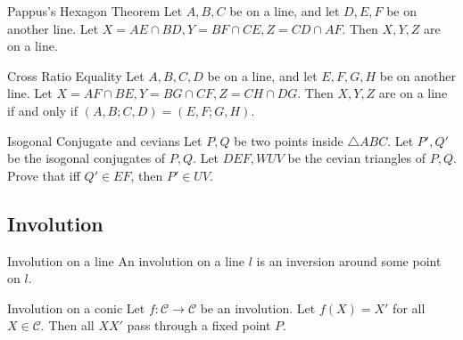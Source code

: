\vspace{-4em}
\begin{minipage}{.5\linewidth}
    \theo{}
    {Pappus's Hexagon Theorem}{
        Let $ A,B,C $ be on a line, and let $ D,E,F $ be on another line. Let
        $ X=AE\cap BD,Y=BF\cap CE,Z=CD\cap AF $. Then $ X,Y,Z $ are on a line.
    }


    \vspace{-2em}

    \theo{}
    {Cross Ratio Equality}{
        Let $ A,B,C,D $ be on a line, and let $ E,F,G,H $ be on another line.
        Let $X=AF\cap BE, Y=BG\cap CF, Z=CH\cap DG$. Then $ X,Y,Z $ are on a
        line if and only if $ (A,B;C,D) = (E,F;G,H) $.
    }	

    \vspace{2em}

    \prob{}
    {Isogonal Conjugate and cevians}{}{
        Let $P, Q$ be two points inside $\triangle ABC$. Let $P', Q'$ be the
        isogonal conjugates of $P, Q$. Let $DEF, WUV$ be the
        cevian triangles of $P, Q$. Prove that iff $Q'\in EF$, then $P'\in
        UV$.
    }
\end{minipage}\hfill%
\begin{minipage}{.47\linewidth}
    \vspace{5em}
    \vspace{2em}
\end{minipage}



\newpage
\subsection{Involution}

\theo{}
{Involution on a line}{
    An involution on a line $ l $ is an inversion around some point on $ l $.
}


\theo{}
{Involution on a conic}{
    Let $ f:\mathcal{C}\to \mathcal{C} $ be an
    involution. Let $ f(X)=X' $ for all $ X\in \mathcal{C} $. Then all $ XX' $
    pass through a fixed point $ P $.
}


